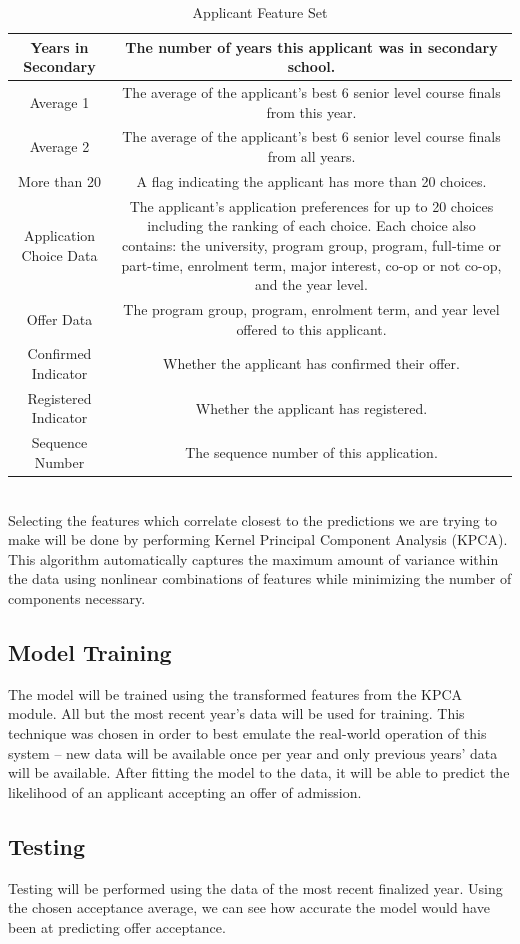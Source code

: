 \documentclass[titlepage]{article}
\begin{document}
\begin{table}[!htbp]
\begin{tabular}{| C{4} | C{10} |}
	Years in Secondary				&The number of years this applicant was in secondary school.\\\hline
	Average 1						&The average of the applicant's best 6 senior level course finals from this year.\\\hline
	Average 2						&The average of the applicant's best 6 senior level course finals from all years.\\\hline
	More than 20					&A flag indicating the applicant has more than 20 choices.\\\hline
	Application Choice Data			&The applicant's application preferences for up to 20 choices including the ranking of each choice. Each choice also contains: the university, program group, program, full-time or part-time, enrolment term, major interest, co-op or not co-op, and the year level.\\\hline
	Offer Data						&The program group, program, enrolment term, and year level offered to this applicant.\\\hline
	Confirmed Indicator				&Whether the applicant has confirmed their offer.\\\hline
	Registered Indicator			&Whether the applicant has registered.\\\hline
	Sequence Number					&The sequence number of this application.\\\hline
\end{tabular}
\caption{Applicant Feature Set}
\label{tab:ApplicantFeatureSet}
\end{table}~\\[6mm]
Selecting the features which correlate closest to the predictions we are trying to make will be done by performing Kernel Principal Component Analysis (KPCA). This algorithm automatically captures the maximum amount of variance within the data using nonlinear combinations of features while minimizing the number of components necessary.
\subsection{Model Training}
The model will be trained using the transformed features from the KPCA module. All but the most recent year's data will be used for training. This technique was chosen in order to best emulate the real-world operation of this system -- new data will be available once per year and only previous years' data will be available. After fitting the model to the data, it will be able to predict the likelihood of an applicant accepting an offer of admission.
\subsection{Testing}
Testing will be performed using the data of the most recent finalized year. Using the chosen acceptance average, we can see how accurate the model would have been at predicting offer acceptance.
\end{document}
